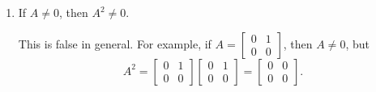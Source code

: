 \documentclass[letterpaper,12pt]{article}
\begin{document}
\begin{enumerate}
\begin{enumerate}
 \item If $A\neq 0$, then $A^2\neq 0$.

\bigskip

This is false in general. For example, if $A=\begin{bmatrix}0&1\\0&0\end{bmatrix}$, then $A\neq 0$, but
\[
 A^2 = \begin{bmatrix}0&1\\0&0\end{bmatrix}\begin{bmatrix}0&1\\0&0\end{bmatrix}=\begin{bmatrix}0&0\\0&0\end{bmatrix}.
\]

 \end{enumerate}
 \end{enumerate}
\end{document}
